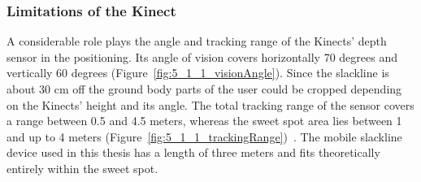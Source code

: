 \subsubsection{Limitations of the Kinect} 
A considerable role plays the angle and tracking range of the Kinects' depth sensor in the positioning.
Its angle of vision covers horizontally 70 degrees and vertically 60 degrees (Figure~\ref{fig:5_1_1_visionAngle}).
Since the slackline is about 30 cm off the ground body parts of the user could be cropped depending on the Kinects' height and its angle.
The total tracking range of the sensor covers a range between 0.5 and 4.5 meters, whereas the sweet spot area lies between 1 and up to 4 meters (Figure~\ref{fig:5_1_1_trackingRange})~\cite{MicrosoftHIG2014-mh}.
The mobile slackline device used in this thesis has a length of three meters and fits theoretically entirely within the sweet spot.
